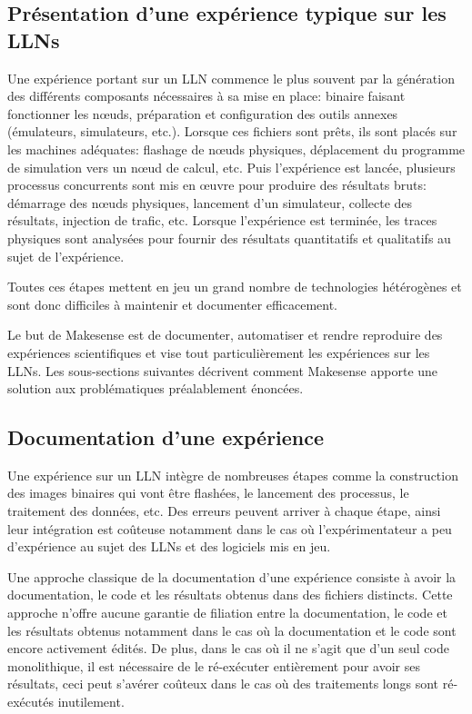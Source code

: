 \subsection{Présentation d'une expérience typique sur les \ac{LLN}s}

Une expérience portant sur un \ac{LLN} commence le plus souvent par la génération des différents composants nécessaires à sa mise en place: binaire faisant fonctionner les nœuds, préparation et configuration des outils annexes (émulateurs, simulateurs, etc.).
Lorsque ces fichiers sont prêts, ils sont placés sur les machines adéquates: flashage de nœuds physiques, déplacement du programme de simulation vers un nœud de calcul, etc.
Puis l'expérience est lancée, plusieurs processus concurrents sont mis en œuvre pour produire des résultats bruts: démarrage des nœuds physiques, lancement d'un simulateur, collecte des résultats, injection de trafic, etc.
Lorsque l'expérience est terminée, les traces physiques sont analysées pour fournir des résultats quantitatifs et qualitatifs au sujet de l'expérience.

Toutes ces étapes mettent en jeu un grand nombre de technologies hétérogènes et sont donc difficiles à maintenir et documenter efficacement.

Le but de Makesense est de documenter, automatiser et rendre reproduire des expériences scientifiques et vise tout particulièrement les expériences sur les \ac{LLN}s.
Les sous-sections suivantes décrivent comment Makesense apporte une solution aux problématiques préalablement énoncées.

\subsection{Documentation d'une expérience}

Une expérience sur un \ac{LLN} intègre de nombreuses étapes comme la construction des images binaires qui vont être flashées, le lancement des processus, le traitement des données, etc.
Des erreurs peuvent arriver à chaque étape, ainsi leur intégration est coûteuse notamment dans le cas où l'expérimentateur a peu d'expérience au sujet des \ac{LLN}s et des logiciels mis en jeu.

Une approche classique de la documentation d'une expérience consiste à avoir la documentation, le code et les résultats obtenus dans des fichiers distincts.
Cette approche n'offre aucune garantie de filiation entre la documentation, le code et les résultats obtenus notamment dans le cas où la documentation et le code sont encore activement édités.
De plus, dans le cas où il ne s'agit que d'un seul code monolithique, il est nécessaire de le ré-exécuter entièrement pour avoir ses résultats, ceci peut s'avérer coûteux dans le cas où des traitements longs sont ré-exécutés inutilement.

